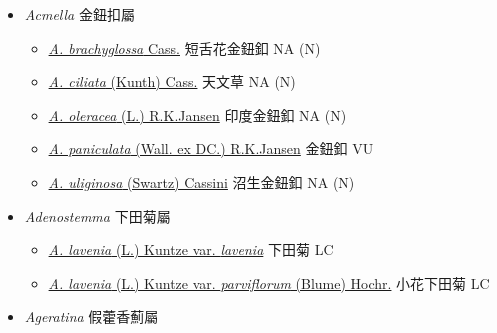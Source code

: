 
  \begin{itemize}
 \item[] \textit{Acmella} 金鈕扣屬
                                
  \begin{itemize}
        \item[] \href{http://www.theplantlist.org/tpl1.1/search?q=Acmella+brachyglossa}{\textit{A. brachyglossa} Cass.}   短舌花金鈕釦   NA (N)
        \item[] \href{http://www.theplantlist.org/tpl1.1/search?q=Acmella+ciliata}{\textit{A. ciliata} (Kunth) Cass.}   天文草   NA (N)
        \item[] \href{http://www.theplantlist.org/tpl1.1/search?q=Acmella+oleracea}{\textit{A. oleracea} (L.) R.K.Jansen}   印度金鈕釦   NA (N)
        \item[] \href{http://www.theplantlist.org/tpl1.1/search?q=Acmella+paniculata}{\textit{A. paniculata} (Wall. ex DC.) R.K.Jansen}   金鈕釦   VU
        \item[] \href{http://www.theplantlist.org/tpl1.1/search?q=Acmella+uliginosa}{\textit{A. uliginosa} (Swartz) Cassini}   沼生金鈕釦   NA (N)
  \end{itemize}
 \item[] \textit{Adenostemma} 下田菊屬
                                
  \begin{itemize}
        \item[] \href{http://www.theplantlist.org/tpl1.1/search?q=Adenostemma+lavenia+var.+lavenia}{\textit{A. lavenia} (L.) Kuntze var. \textit{lavenia}}   下田菊   LC
        \item[] \href{http://www.theplantlist.org/tpl1.1/search?q=Adenostemma+lavenia+var.+parviflorum}{\textit{A. lavenia} (L.) Kuntze var. \textit{parviflorum} (Blume) Hochr.}   小花下田菊   LC
  \end{itemize}
 \item[] \textit{Ageratina} 假藿香薊屬
                                

\end{itemize}
